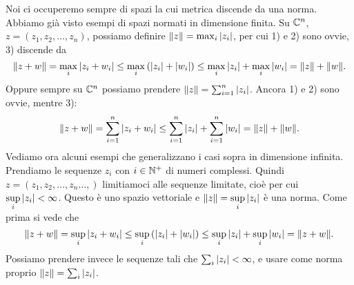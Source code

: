 Noi ci occuperemo sempre di spazi la cui metrica discende da una norma.
Abbiamo già visto esempi di spazi normati in dimensione finita. Su $\mathbb C^n$,
$z = \left( z_1, z_2, \ldots, z_n \right)$, possiamo definire
$\|z\| = \max_i {\left|z_i\right|}$, per cui 1) e 2) sono ovvie, 3) discende da \[
\|z + w\| = \max_i {\left|z_i + w_i\right|} \leq \max_i \left({\left|z_i\right|} + {\left|w_i\right|}\right)
\leq \max_i {\left|z_i\right|} + \max_i {\left|w_i\right|} = \|z\| + \|w\|
.\] 
Oppure sempre su $\mathbb C^n$ possiamo prendere $\|z\| = \sum_{i=1}^{n} {\left|z_i\right|}$.
Ancora 1) e 2) sono ovvie, mentre 3):
\[
	\|z + w\| = \sum_{i=1}^{n} {\left|z_i + w_i\right|} \leq \sum_{i=1}^{n} {\left|z_i\right|} +
	\sum_{i=1}^{n} {\left|w_i\right|} = \|z\| + \|w\|
.\] 
Vediamo ora alcuni esempi che generalizzano i casi sopra in dimensione
infinita. Prendiamo le sequenze $z_i$ con $i \in \mathbb N^+$ di numeri complessi.
Quindi $z = \left( z_1, z_2, \ldots, z_n \ldots,  \right)$ limitiamoci alle
sequenze limitate, cioè per cui $\displaystyle \sup_i {\left|z_i\right|} < \infty$. Questo è uno
spazio vettoriale e $\|z\| = \displaystyle \sup_i {\left|z_i\right|}$ è una norma.
Come prima si vede che
\[
	\|z + w \| = \sup_i {\left|z_i + w_i\right|} \leq \sup_i \left({\left|z_i\right|} + {\left|w_i\right|}
	\right) \leq \sup_i {\left|z_i\right|} + \sup_i {\left|w_i\right|} = \| z + w\| 
.\] 
Possiamo prendere invece le sequenze tali che 
$\sum_i {\left|z_i\right|} < \infty$, e usare come norma proprio 
$\|z\| = \sum_{i} {\left|z_i\right|}$. 

